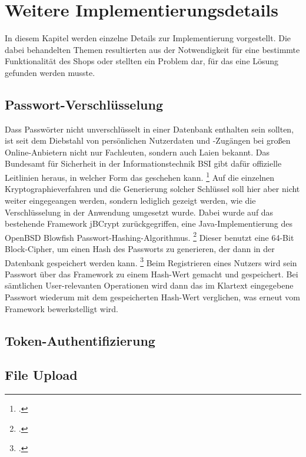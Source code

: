 \section{Weitere Implementierungsdetails} \thispagestyle{nomarkstyle}
In diesem Kapitel werden einzelne Details zur Implementierung vorgestellt.
Die dabei behandelten Themen resultierten aus der Notwendigkeit für eine bestimmte Funktionalität des Shops oder stellten ein Problem dar, für das eine Lösung gefunden werden musste.
\subsection{Passwort-Verschlüsselung}
Dass Passwörter nicht unverschlüsselt in einer Datenbank enthalten sein sollten, ist seit dem Diebstahl von persönlichen Nutzerdaten und -Zugängen bei großen Online-Anbietern nicht nur Fachleuten, sondern auch Laien bekannt.
Das Bundesamt für Sicherheit in der Informationstechnik \acs{BSI} gibt dafür offizielle Leitlinien heraus, in welcher Form das geschehen kann. \footcite[Vgl.][]{BSI2016}
Auf die einzelnen Kryptographieverfahren und die Generierung solcher Schlüssel soll hier aber nicht weiter eingegeangen werden, sondern lediglich gezeigt werden, wie die Verschlüsselung in der Anwendung umgesetzt wurde.
Dabei wurde auf das bestehende Framework jBCrypt zurückgegriffen, eine Java-Implementierung des OpenBSD Blowfish Passwort-Hashing-Algorithmus. \footcite[Vgl.][]{jBCrypt2015}
Dieser benutzt eine 64-Bit Block-Cipher, um einen Hash des Passworts zu generieren, der dann in der Datenbank gespeichert werden kann. \footcite[Vgl.][]{Provos}
Beim Registrieren eines Nutzers wird sein Passwort über das Framework zu einem Hash-Wert gemacht und gespeichert.
Bei sämtlichen User-relevanten Operationen wird dann das im Klartext eingegebene Passwort wiederum mit dem gespeicherten Hash-Wert verglichen, was erneut vom Framework bewerkstelligt wird.
\subsection{Token-Authentifizierung}

\subsection{File Upload}
